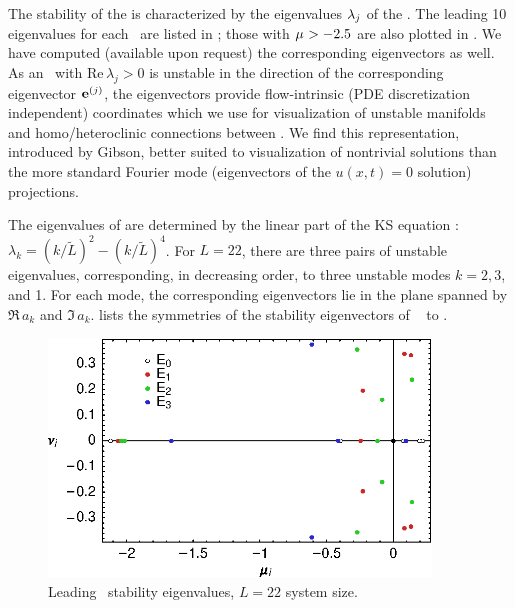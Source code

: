 The stability of the {\eqva} is characterized by the eigenvalues
$\eigExp[j]$ of the \stabmat.  The leading 10 eigenvalues for each
\eqv\ are listed in ;
those with $\eigRe > -2.5$ are also plotted in
.
We have computed (available upon request) the corresponding
eigenvectors as well. As an \eqv\ with $\mathrm{Re}\,
\lambda_j > 0$ is unstable in the direction of the
corresponding eigenvector $\jEigvec{j}$, the eigenvectors
provide flow-intrinsic (PDE discretization independent)
coordinates which we use for visualization of unstable
manifolds and homo/heteroclinic connections between \eqva.
We find this representation, introduced by
Gibson, better suited to visualization
of nontrivial solutions than the more standard Fourier mode
(eigenvectors of the $u(x,t)=0$ solution) projections.

The eigenvalues of  are determined by the linear part of the KS
equation : $\lambda_k=(k/\tilde{L})^2-(k/\tilde{L})^4$.
For $L=22$, there are three pairs of unstable eigenvalues, corresponding,
in decreasing order, to three unstable modes $k=2,3$, and 1.  For each
mode, the corresponding eigenvectors lie in the plane spanned by
$\Re \, a_k$ and $\Im \, a_k$. 
lists the symmetries of the stability eigenvectors of
\eqva\  to .

\begin{figure}[t]
\begin{center}
\includegraphics[width=4in]{figs_bmp/L22-eqvaEigenvalues.eps}
\end{center}
\caption{
Leading  \eqv\ stability eigenvalues,
$L=22$ system size.
}
\label{f:KS22EkEigs}
\end{figure}

